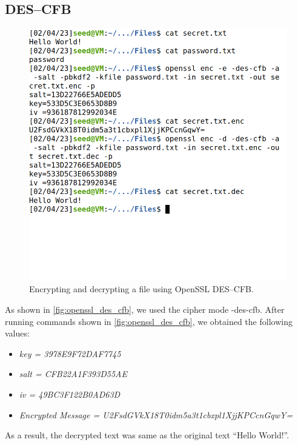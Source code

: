 \subsection{DES--CFB}
%
\begin{figure}
    \centering
    \includegraphics[height=\textheight,width=\textwidth,keepaspectratio]
    {figures/des-cfb-enc-dec.png}
    \caption{Encrypting and decrypting a file using OpenSSL DES--CFB.}
    \label{fig:openssl_des_cfb}
\end{figure}

As shown in \autoref{fig:openssl_des_cfb}, we used the cipher mode
{\selectfont -des-cfb}. After running commands shown
in \autoref{fig:openssl_des_cfb}, we obtained the following values:

\begin{itemize}
    \item \emph{key = 3978E9F72DAF7745}
    \item \emph{salt = CFB22A1F393D55AE}
    \item \emph{iv = 49BC3F122B0AD63D}
    \item \emph{Encrypted Message = U2FsdGVkX18T0idm5a3t1cbxpl1XjjKPCcnGqwY=}
\end{itemize}

As a result, the decrypted text was same as the original text ``Hello World!''.

